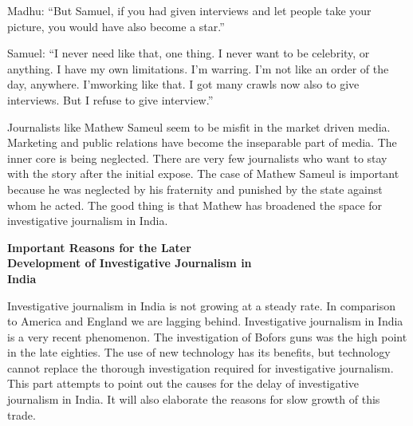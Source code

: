 \begin{multicols}{2}

\noi
Madhu: “But Samuel, if you had given interviews and let people take your picture, you would
have also become a star.”


\noi
Samuel: “I never need like that, one thing. I never want to be celebrity, or anything. I have my
own limitations. I’m warring. I’m not like an order of the day, anywhere. I’mworking like that.
I got many crawls now also to give interviews. But I refuse to give interview.”


\noi
Journalists like Mathew Sameul seem to be misfit in the market driven media. Marketing and
public relations have become the inseparable part of media. The inner core is being neglected.
There are very few journalists who want to stay with the story after the initial expose. The
case of Mathew Sameul is important because he was neglected by his fraternity and punished
by the state against whom he acted. The good thing is that Mathew has broadened the space for
investigative journalism in India.


\noi
{\large \bfseries  Important Reasons for the Later\\ Development of Investigative Journalism in\\ India}


\noi
Investigative journalism in India is not growing at a steady rate. In comparison to America and
England we are lagging behind. Investigative journalism in India is a very recent phenomenon.
The investigation of Bofors guns was the high point in the late eighties. The use of new
technology has its benefits, but technology cannot replace the thorough investigation required
for investigative journalism. This part attempts to point out the causes for the delay of
investigative journalism in India. It will also elaborate the reasons for slow growth of this trade.




\end{multicols}
